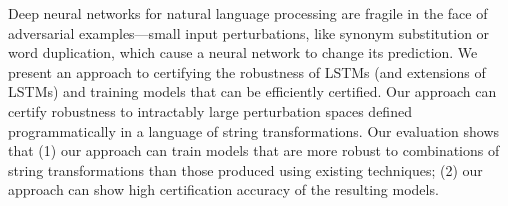 Deep neural networks for natural language processing are fragile in the face of adversarial examples---small input perturbations, like synonym substitution or word duplication, which cause a neural network to change its prediction. We present an approach to certifying the robustness of LSTMs (and extensions of LSTMs) and training models that can be efficiently certified. Our approach can certify robustness to intractably large perturbation spaces defined programmatically in a language of string transformations. Our evaluation shows that (1) our approach can train models that are more robust to combinations of string transformations than those produced using existing techniques; (2) our approach can show high certification accuracy of the resulting models.

